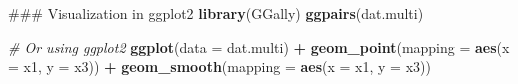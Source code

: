 \documentclass[12pt,]{book}
\newenvironment{Shaded}{\begin{snugshade}}{\end{snugshade}}
\newcommand{\KeywordTok}[1]{\textcolor[rgb]{0.13,0.29,0.53}{\textbf{#1}}}
\newcommand{\DataTypeTok}[1]{\textcolor[rgb]{0.13,0.29,0.53}{#1}}
\newcommand{\DecValTok}[1]{\textcolor[rgb]{0.00,0.00,0.81}{#1}}
\newcommand{\StringTok}[1]{\textcolor[rgb]{0.31,0.60,0.02}{#1}}
\newcommand{\CommentTok}[1]{\textcolor[rgb]{0.56,0.35,0.01}{\textit{#1}}}
\newcommand{\OperatorTok}[1]{\textcolor[rgb]{0.81,0.36,0.00}{\textbf{#1}}}
\newcommand{\NormalTok}[1]{#1}
\begin{document}
\begin{Shaded}
\begin{Highlighting}[]
\NormalTok{### Visualization in ggplot2}
\KeywordTok{library}\NormalTok{(GGally)}
\KeywordTok{ggpairs}\NormalTok{(dat.multi)}
\end{Highlighting}
\end{Shaded}

\begin{Shaded}
\end{Shaded}

\begin{Shaded}
\begin{Highlighting}[]
\CommentTok{# Or using ggplot2}
\KeywordTok{ggplot}\NormalTok{(}\DataTypeTok{data =}\NormalTok{ dat.multi) }\OperatorTok{+}\StringTok{ }
\StringTok{  }\KeywordTok{geom_point}\NormalTok{(}\DataTypeTok{mapping =} \KeywordTok{aes}\NormalTok{(}\DataTypeTok{x =}\NormalTok{ x1, }\DataTypeTok{y =}\NormalTok{ x3)) }\OperatorTok{+}
\StringTok{  }\KeywordTok{geom_smooth}\NormalTok{(}\DataTypeTok{mapping =} \KeywordTok{aes}\NormalTok{(}\DataTypeTok{x =}\NormalTok{ x1, }\DataTypeTok{y =}\NormalTok{ x3))}
\end{Highlighting}
\end{Shaded}


\end{document}
